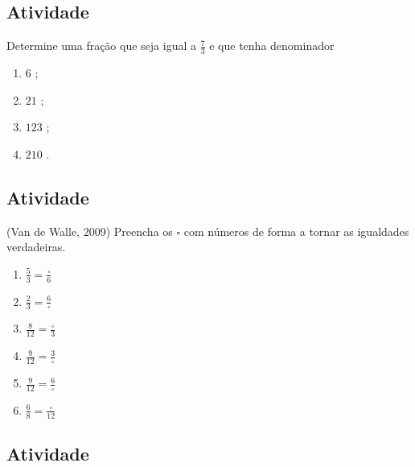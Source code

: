 \documentclass[a4,12pt]{book}
\begin{document}
\subsection{Atividade}







Determine uma fração que seja igual a $\frac{7}{3}$ e que tenha denominador

\begin{enumerate} [\quad a)] %
  \item         $6$    ;
  \item         $21$    ;
  \item         $123$    ;
  \item         $210$    .
\end{enumerate} %







\subsection{Atividade}







(Van de Walle, 2009)
Preencha os $\square$ com números de forma a tornar as igualdades verdadeiras.

\begin{enumerate} [\quad I)] %
  \item         $\frac{5}{3} = \frac{\square}{6}$
  \item         $\frac{2}{3} = \frac{6}{\square}$
  \item         $\frac{8}{12} = \frac{\square}{3}$
  \item         $\frac{9}{12} = \frac{3}{\square}$
  \item         $\frac{9}{12} = \frac{6}{\square}$
  \item         $\frac{6}{8} = \frac{\square}{12}$
\end{enumerate} %







\subsection{Atividade}
\end{document}
